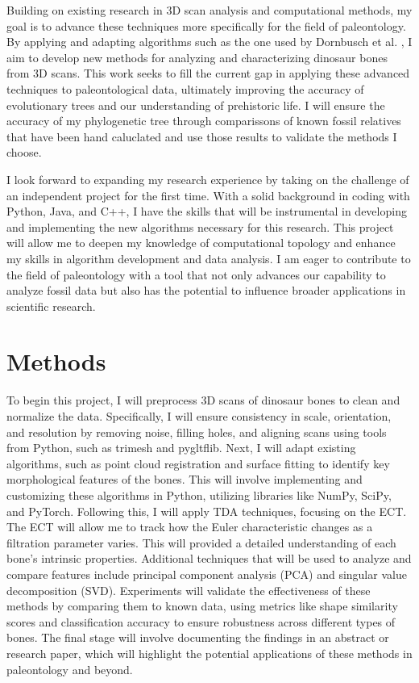 \documentclass[12pt]{article}
\begin{document}
Building on existing research in 3D scan analysis and computational methods, my
goal is to advance these techniques more specifically for the field of
paleontology. By applying and adapting algorithms such as the one used by
Dornbusch et al. \citep{dornbusch2007}, I aim to develop new methods for analyzing 
and characterizing dinosaur bones from 3D scans. This work seeks to fill the 
current gap in applying these advanced techniques to paleontological data, 
ultimately improving the accuracy of evolutionary trees and our understanding of 
prehistoric life. I will ensure the accuracy of my phylogenetic tree through
comparissons of known fossil relatives that have been hand caluclated and use
those results to validate the methods I choose.

I look forward to expanding my research experience by taking on the challenge of
an independent project for the first time. With a solid background in
coding with Python, Java, and C++, I have the skills that will be instrumental 
in developing and implementing the new algorithms necessary for this research. 
This project will allow me to deepen my knowledge of computational topology and 
enhance my skills in algorithm development and data analysis. I am eager to 
contribute to the field of paleontology with a tool that not only advances our 
capability to analyze fossil data but also has the potential to influence broader 
applications in scientific research.

\section{Methods}
To begin this project, I will preprocess 3D scans of dinosaur bones to clean and
normalize the data. Specifically, I will ensure consistency in scale, orientation, and resolution
by removing noise, filling holes, and aligning scans using tools from Python,
such as trimesh and pygltflib. Next, I will adapt existing algorithms, such as
point cloud registration and surface fitting to identify key morphological
features of the bones. This will involve implementing and customizing these
algorithms in Python, utilizing libraries like NumPy, SciPy, and PyTorch.
Following this, I will apply TDA techniques, focusing on the ECT. The ECT will
allow me to track how the Euler characteristic changes as a filtration parameter
varies. This will provided a detailed understanding of each bone's intrinsic
properties. Additional techniques that will be used to analyze and compare
features include principal component analysis (PCA) and singular value 
decomposition (SVD). Experiments will validate the effectiveness of these methods 
by comparing them to known data, using metrics like shape similarity scores and 
classification accuracy to ensure robustness across different types of bones. 
The final stage will involve documenting the findings in an abstract or research 
paper, which will highlight the potential applications of these methods in 
paleontology and beyond.
\end{document}
